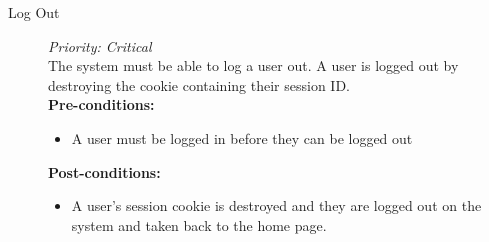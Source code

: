 \begin{description}
	\item[Log Out]\hfill \textit{Priority: Critical} \\
		The system must be able to log a user out. A user is logged out by destroying the cookie containing their
		session ID.\\
		\textbf{Pre-conditions:} 
			\begin{itemize}
				\item A user must be logged in before they can be logged out
			\end{itemize}
		\textbf{Post-conditions:} 
			\begin{itemize}
			
				\item A user's session cookie is destroyed and they are logged out on the system and taken back to the home page.
				
			\end{itemize}
\end{description}